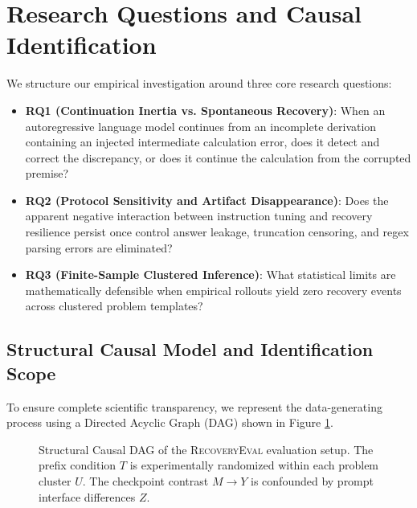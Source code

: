 \documentclass[11pt,letterpaper]{article}
\newcommand{\framework}{\textsc{RecoveryEval}}
\begin{document}
\section{Research Questions and Causal Identification}

We structure our empirical investigation around three core research questions:
\begin{itemize}[leftmargin=*]
    \item \textbf{RQ1 (Continuation Inertia vs. Spontaneous Recovery)}: When an autoregressive language model continues from an incomplete derivation containing an injected intermediate calculation error, does it detect and correct the discrepancy, or does it continue the calculation from the corrupted premise?
    \item \textbf{RQ2 (Protocol Sensitivity and Artifact Disappearance)}: Does the apparent negative interaction between instruction tuning and recovery resilience persist once control answer leakage, truncation censoring, and regex parsing errors are eliminated?
    \item \textbf{RQ3 (Finite-Sample Clustered Inference)}: What statistical limits are mathematically defensible when empirical rollouts yield zero recovery events across clustered problem templates?
\end{itemize}

\subsection{Structural Causal Model and Identification Scope}

To ensure complete scientific transparency, we represent the data-generating process using a Directed Acyclic Graph (DAG) shown in Figure \ref{fig:dag}.

\begin{figure}[htbp]
\centering
{}
\caption{Structural Causal DAG of the \framework{} evaluation setup. The prefix condition $T$ is experimentally randomized within each problem cluster $U$. The checkpoint contrast $M \to Y$ is confounded by prompt interface differences $Z$.}
\label{fig:dag}
\end{figure}
\end{document}
